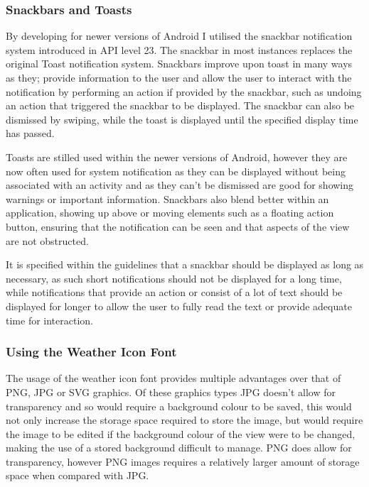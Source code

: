 \subsubsection{Snackbars and Toasts}\label{snackbars-and-toasts}

By developing for newer versions of Android I utilised the snackbar
notification system introduced in API level 23. The snackbar in most
instances replaces the original Toast notification system. Snackbars
improve upon toast in many ways as they; provide information to the user
and allow the user to interact with the notification by performing an
action if provided by the snackbar, such as undoing an action that
triggered the snackbar to be displayed. The snackbar can also be
dismissed by swiping, while the toast is displayed until the specified
display time has passed.

Toasts are stilled used within the newer versions of Android, however
they are now often used for system notification as they can be displayed
without being associated with an activity and as they can't be dismissed
are good for showing warnings or important information. Snackbars also
blend better within an application, showing up above or moving elements
such as a floating action button, ensuring that the notification can be
seen and that aspects of the view are not obstructed.

It is specified within the guidelines that a snackbar should be
displayed as long as necessary, as such short notifications should not
be displayed for a long time, while notifications that provide an action
or consist of a lot of text should be displayed for longer to allow the
user to fully read the text or provide adequate time for interaction.

\subsubsection{Using the Weather Icon
Font}\label{using-the-weather-icon-font}

The usage of the weather icon font provides multiple advantages over
that of PNG, JPG or SVG graphics. Of these graphics types JPG doesn't
allow for transparency and so would require a background colour to be
saved, this would not only increase the storage space required to store
the image, but would require the image to be edited if the background
colour of the view were to be changed, making the use of a stored
background difficult to manage. PNG does allow for transparency, however
PNG images requires a relatively larger amount of storage space when
compared with JPG.


